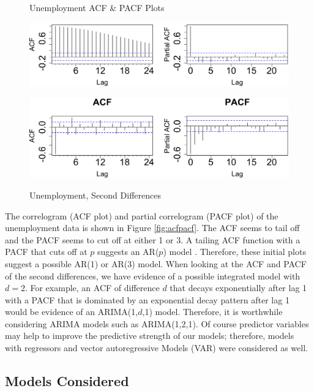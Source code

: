 \documentclass[twoside,twocolumn]{article}
\begin{document}
    \begin{figure}[hbt]
    	\centering
     	\caption{Unemployment ACF \& PACF Plots}
     	\includegraphics[width=\linewidth]{images/acfpacf}
     	\label{fig:acfpacf}
     	\caption{Unemployment, Second Differences}
     	\includegraphics[width=\linewidth]{images/acfpacf2d}
     	\label{fig:acfpacf2}
      \end{figure}

  The correlogram (ACF plot) and partial correlogram (PACF plot) of the unemployment data is shown in Figure \ref{fig:acfpacf}. The ACF seems to tail off and the PACF seems to cut off at either 1 or 3.  A tailing ACF function with a PACF that cuts off at \(p\) suggests an AR(\(p\)) model \citep{Box2008}. Therefore, these initial plots suggest a possible AR(1) or AR(3) model. When looking at the ACF and PACF of the second differences, we have evidence of a possible integrated model with \(d=2\). For example, an ACF of difference \(d\) that decays exponentially after lag 1 with a PACF that is dominated by an exponential decay pattern after lag 1 would be evidence of an ARIMA(1,\(d\),1) model. Therefore, it is worthwhile considering ARIMA models such as ARIMA(1,2,1). Of course predictor variables may help to improve the predictive strength of our models; therefore, models with regressors and vector autoregressive Models (VAR) were considered as well.
\subsection{Models Considered}
\end{document}
